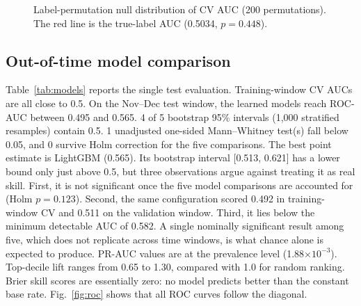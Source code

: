 \documentclass[conference]{IEEEtran}
\begin{document}
\begin{figure}[t]
\centering
{}
\caption{Label-permutation null distribution of CV AUC (200 permutations). The red line is the true-label AUC (0.5034, $p=0.448$).}\label{fig:perm}
\end{figure}

\subsection{Out-of-time model comparison}
Table~\ref{tab:models} reports the single test evaluation. Training-window CV AUCs are all close to 0.5. On the Nov--Dec test window, the learned models reach ROC-AUC between 0.495 and 0.565. 4 of 5 bootstrap 95\% intervals (1,000 stratified resamples) contain 0.5. 1 unadjusted one-sided Mann--Whitney test(s) fall below 0.05, and 0 survive Holm correction for the five comparisons. The best point estimate is LightGBM (0.565). Its bootstrap interval [0.513, 0.621] has a lower bound only just above 0.5, but three observations argue against treating it as real skill. First, it is not significant once the five model comparisons are accounted for (Holm $p=0.123$). Second, the same configuration scored 0.492 in training-window CV and 0.511 on the validation window. Third, it lies below the minimum detectable AUC of 0.582. A single nominally significant result among five, which does not replicate across time windows, is what chance alone is expected to produce. PR-AUC values are at the prevalence level (1.88$\times10^{-3}$). Top-decile lift ranges from 0.65 to 1.30, compared with 1.0 for random ranking. Brier skill scores are essentially zero: no model predicts better than the constant base rate. Fig.~\ref{fig:roc} shows that all ROC curves follow the diagonal.
\end{document}
